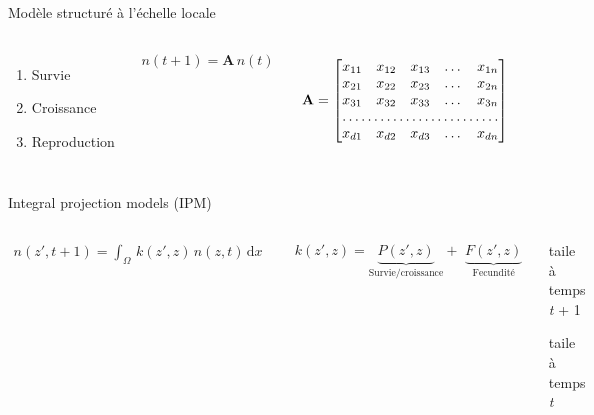 \documentclass[11pt, compress, aspectratio=1610]{beamer}
\providecommand{\tightlist}{%
  \setlength{\itemsep}{0pt}\setlength{\parskip}{0pt}}
\newcommand{\begincols}{\begin{columns}}
\newcommand{\stopcols}{\end{columns}}
\begin{document}
\begin{frame}{Modèle structuré à l'échelle locale}

\begincols
{}

\begin{enumerate}
    \def\labelenumi{\arabic{enumi}.}
    \tightlist
    \item
      Survie
    \item
      Croissance
    \item
      Reproduction
  \end{enumerate}

\hfill{}

\begin{align*}
    n(t + 1) = \textbf{A}\, n(t)
  \end{align*}

\[
  \textbf{A} =
  \begin{bmatrix}
    x_{11}       & x_{12} & x_{13} & \dots & x_{1n} \\
    x_{21}       & x_{22} & x_{23} & \dots & x_{2n} \\
    x_{31}       & x_{32} & x_{33} & \dots & x_{3n} \\
    \hdotsfor{5} \\
    x_{d1}       & x_{d2} & x_{d3} & \dots & x_{dn}
\end{bmatrix}
  \] \stopcols

\end{frame}

\begin{frame}{Integral projection models (IPM)}

\begincols
{}

\begin{align*}
    n(z', t + 1) = \int_{\Omega} \, k(z', z)\, n(z, t)\, \mathrm{d}x
  \end{align*}

\begin{align*}
    k(z', z) = \underbrace{P(z', z)}_\text{Survie/croissance} + \,\, \underbrace{F(z', z)}_\text{Fecundité}
  \end{align*}

\hfill{}

\begin{description}
\tightlist
\item[z']
taile à temps \textit{t} + 1
\item[z]
taile à temps \textit{t}
\end{description}

\stopcols

\end{frame}
\end{document}
